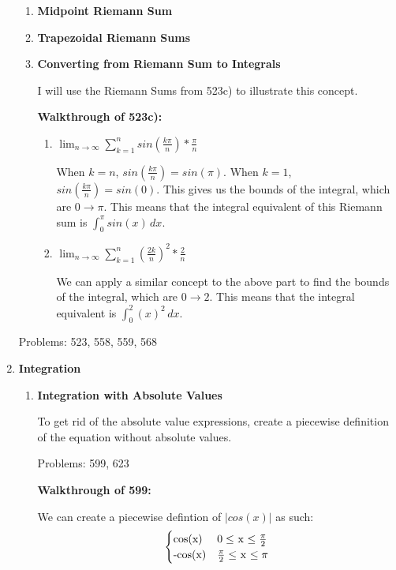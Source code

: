 \documentclass[11pt,twoside]{article}
\begin{document}
\begin{enumerate}
\begin{enumerate}
    \item \textbf{Midpoint Riemann Sum} 
    \item \textbf{Trapezoidal Riemann Sums}
    \item \textbf{Converting from Riemann Sum to Integrals}
    
    I will use the Riemann Sums from 523c) to illustrate this concept.
    
    \textbf{Walkthrough of 523c):}
    
    \begin{enumerate}
        
        \item 
        $\lim_{n \to\infty} \sum_{k=1} ^{n} sin(\frac{k \pi}{n}) * \frac{\pi}{n}$
        
        When $k = n$, $sin(\frac{k \pi}{n}) = sin(\pi).$ When $k = 1$, $sin(\frac{k \pi}{n}) = sin(0).$ This gives us the bounds of the integral, which are $0\rightarrow\pi.$ This means that the integral equivalent of this Riemann sum is $\int_{0}^{\pi} sin(x) \,dx$.
        
        \item 
        $\lim_{n \to\infty} \sum_{k=1} ^{n} (\frac{2k}{n})^2 * \frac{2}{n}$
        
        We can apply a similar concept to the above part to find the bounds of the integral, which are $0\rightarrow2$. This means that the integral equivalent is $\int_{0}^{2} (x)^2 \,dx$.
    
    \end{enumerate}


  \end{enumerate}

Problems: 523, 558, 559, 568
  
\item \textbf{Integration}

\begin{enumerate}
    \item \textbf{Integration with Absolute Values}
    
    To get rid of the absolute value expressions, create a piecewise definition of the equation without absolute values. 
    
    Problems: 599, 623
    
    \textbf{Walkthrough of 599:}
    
    We can create a piecewise defintion of $|cos(x)|$ as such:
    \[ \begin{cases} 
    $cos(x)$ &  0 \leq $ x $ \leq \frac{\pi}{2} \\
    $-cos(x)$ &  \frac{\pi}{2} \leq $ x $ \leq \pi 
    \end{cases}
    \]
    

\end{enumerate}
\end{enumerate}
\end{document}
